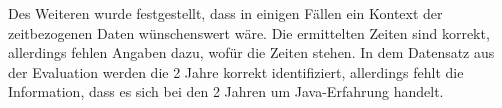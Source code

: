Des Weiteren wurde festgestellt, dass in einigen Fällen ein Kontext der zeitbezogenen Daten wünschenswert wäre. Die ermittelten Zeiten sind korrekt, allerdings fehlen Angaben dazu, wofür die Zeiten stehen. In dem Datensatz aus der Evaluation werden die 2 Jahre korrekt identifiziert, allerdings fehlt die Information, dass es sich bei den 2 Jahren um Java-Erfahrung handelt.
\newpage
